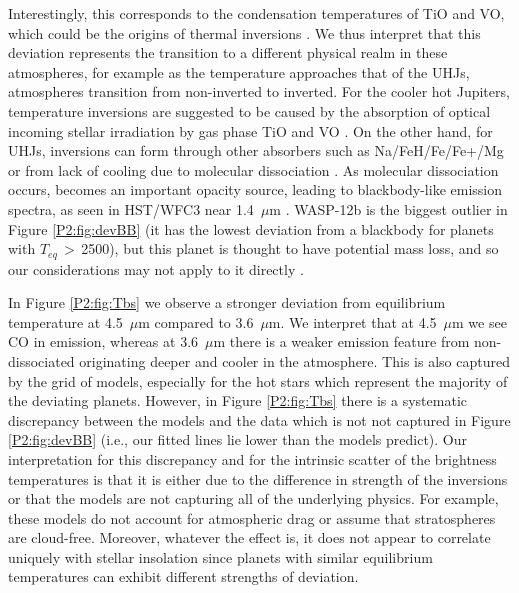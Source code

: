 Interestingly, this corresponds to the condensation temperatures of TiO and VO, which could be the origins of thermal inversions \citep{Hubeny2003, Burrows2007, Fortney2008}. We thus interpret that this deviation represents the transition to a different physical realm in these atmospheres, for example as the temperature approaches that of the UHJs, atmospheres transition from  non-inverted to inverted. For the cooler hot Jupiters, temperature inversions are suggested to be caused by the absorption of optical incoming stellar irradiation by gas phase TiO and VO \citep{Hubeny2003, Fortney2008}. On the other hand, for UHJs, inversions can form through other absorbers such as Na/FeH/Fe/Fe+/Mg \citep[e.g][]{Lothringer2018, Pino2020} or from lack of cooling due to molecular dissociation \citep{Parmentier2018}. As molecular dissociation occurs,  becomes an important opacity source, leading to blackbody-like emission spectra, as seen in HST/WFC3 near 1.4~$\mu$m \citep[e.g.,][]{Arcangeli2018}. WASP-12b is the biggest outlier in Figure \ref{P2:fig:devBB} (it has the lowest deviation from a blackbody for planets with $T_{eq}$\,$>$\,2500), but this planet is thought to have potential mass loss, and so our considerations may not apply to it directly \citep{Cowan2012, Bell2019}.

In Figure \ref{P2:fig:Tbs} we observe a stronger deviation from equilibrium temperature at 4.5~$\mu$m compared to 3.6~$\mu$m. We interpret that at 4.5~$\mu$m we see CO in emission, whereas at 3.6~$\mu$m there is a weaker emission feature from non-dissociated  originating deeper and cooler in the atmosphere. This is also captured by the grid of models, especially for the hot stars which represent the majority of the deviating planets. However, in Figure \ref{P2:fig:Tbs} there is a systematic discrepancy between the models and the data which is not not captured in Figure \ref{P2:fig:devBB} (i.e., our fitted lines lie lower than the models predict). Our interpretation for this discrepancy and for the intrinsic scatter of the brightness temperatures is that it is either due to the difference in strength of the inversions or that the models are not capturing all of
the underlying physics. For example, these models do not account for  atmospheric drag \citep[e.g.,][]{Arcangeli2019} or assume that stratospheres are cloud-free. Moreover, whatever the effect is, it does not appear to correlate uniquely with stellar insolation since planets with similar equilibrium temperatures can exhibit different strengths of deviation.


